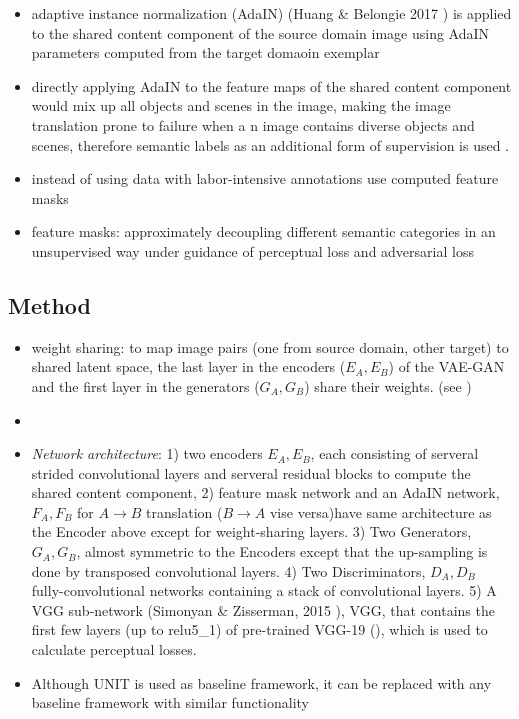 \begin{itemize}
	\item adaptive instance normalization (AdaIN) (Huang \& Belongie 2017 ) is applied to the shared content component of the source domain image using AdaIN parameters computed from the target domaoin exemplar
	\item directly applying AdaIN to the feature maps of the shared content component would mix up all objects and scenes in the image, making the image translation prone to failure when a n image contains diverse objects and scenes, therefore semantic labels as an additional form of supervision is used . 
	\item instead of using data with labor-intensive annotations use computed feature masks
	\item feature masks: approximately decoupling different semantic categories in an unsupervised way under guidance of perceptual loss and adversarial loss
\end{itemize}

\subsection{Method}
\begin{itemize}
	\item weight sharing: to map image pairs (one from source domain, other target) to shared latent space, the last layer in the encoders ($E_A, E_B$) of the VAE-GAN and the first layer in the generators ($G_A, G_B$)  share their weights. (see )
	\item {}
	\item \textit{Network architecture}: 1) two encoders $E_A, E_B$, each consisting of serveral strided convolutional layers and serveral residual blocks to compute the shared content component, 2) feature mask network and an AdaIN network, $F_A, F_B$ for $A \rightarrow B$ translation ($B \rightarrow A$ vise versa)have same architecture as the Encoder above  except for weight-sharing layers. 3) Two Generators, $G_A, G_B$, almost symmetric to the Encoders except that the up-sampling is done by transposed convolutional layers. 4) Two Discriminators, $D_A, D_B$ fully-convolutional networks containing a stack of convolutional layers. 5) A VGG sub-network (Simonyan \& Zisserman, 2015 ), VGG, that contains the first few layers (up to relu5\_1) of pre-trained VGG-19 (), which is used to calculate perceptual losses. 
	\item Although UNIT is used as baseline framework, it can be replaced with any baseline framework with similar functionality
\end{itemize}

